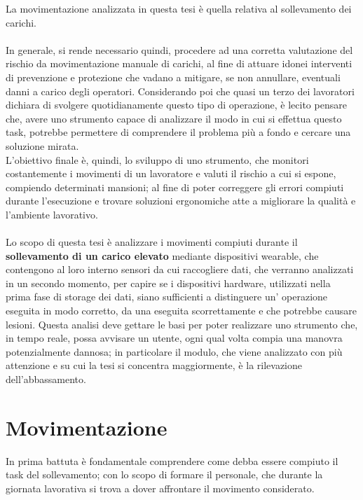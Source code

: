 \documentclass[a4paper, oneside]{book}
\begin{document}
La movimentazione analizzata in questa tesi è quella relativa al sollevamento dei carichi. \\ \\
In generale, si rende necessario quindi, procedere ad una corretta valutazione del rischio da movimentazione manuale di carichi, al fine di attuare idonei interventi di prevenzione e protezione che vadano a mitigare, se non annullare, eventuali danni a carico degli operatori. Considerando poi che quasi un terzo dei lavoratori dichiara di svolgere quotidianamente questo tipo di operazione, è lecito pensare che, avere uno strumento capace di analizzare il modo in cui si effettua questo task, potrebbe permettere di comprendere il problema più a fondo e cercare una soluzione mirata.\\
L'obiettivo finale è, quindi, lo sviluppo di uno strumento, che monitori costantemente i movimenti di un lavoratore e valuti il rischio a cui si espone, compiendo determinati mansioni; al fine di poter correggere gli errori compiuti durante l'esecuzione e trovare soluzioni ergonomiche atte a migliorare la qualità e l'ambiente lavorativo.\\ \\
Lo scopo di questa tesi è analizzare i movimenti compiuti durante il \textbf{sollevamento di un carico elevato} mediante dispositivi wearable, che contengono al loro interno sensori da cui raccogliere dati, che verranno analizzati in un secondo momento, per capire se i dispositivi hardware, utilizzati nella prima fase di storage dei dati, siano sufficienti a distinguere un' operazione eseguita in modo corretto, da una eseguita scorrettamente e che potrebbe causare lesioni. Questa analisi deve gettare le basi per poter realizzare uno strumento che, in tempo reale, possa avvisare un utente, ogni qual volta compia una manovra potenzialmente dannosa; in particolare il modulo, che viene analizzato con più attenzione e su cui la tesi si concentra maggiormente, è la rilevazione dell'abbassamento.


	\clearpage

	\chapter{Movimentazione}

In prima battuta è fondamentale comprendere come debba essere compiuto il task del sollevamento; con lo scopo di formare il personale, che durante la giornata lavorativa si trova a dover affrontare il movimento considerato. 
\end{document}
